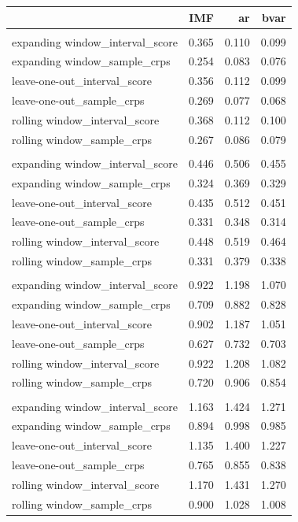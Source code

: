 \documentclass[
]{article}
\begin{document}
\begin{longtable}{l|rrr}
\toprule
\multicolumn{1}{l}{} & IMF & ar & bvar \\ 
\midrule\addlinespace[2.5pt]
\multicolumn{4}{l}{horizon = 0} \\ 
\midrule\addlinespace[2.5pt]
expanding window\_interval\_score & 0.365 & 0.110 & 0.099 \\ 
expanding window\_sample\_crps & 0.254 & 0.083 & 0.076 \\ 
leave-one-out\_interval\_score & 0.356 & 0.112 & 0.099 \\ 
leave-one-out\_sample\_crps & 0.269 & 0.077 & 0.068 \\ 
rolling window\_interval\_score & 0.368 & 0.112 & 0.100 \\ 
rolling window\_sample\_crps & 0.267 & 0.086 & 0.079 \\ 
\midrule\addlinespace[2.5pt]
\multicolumn{4}{l}{horizon = 0.5} \\ 
\midrule\addlinespace[2.5pt]
expanding window\_interval\_score & 0.446 & 0.506 & 0.455 \\ 
expanding window\_sample\_crps & 0.324 & 0.369 & 0.329 \\ 
leave-one-out\_interval\_score & 0.435 & 0.512 & 0.451 \\ 
leave-one-out\_sample\_crps & 0.331 & 0.348 & 0.314 \\ 
rolling window\_interval\_score & 0.448 & 0.519 & 0.464 \\ 
rolling window\_sample\_crps & 0.331 & 0.379 & 0.338 \\ 
\midrule\addlinespace[2.5pt]
\multicolumn{4}{l}{horizon = 1} \\ 
\midrule\addlinespace[2.5pt]
expanding window\_interval\_score & 0.922 & 1.198 & 1.070 \\ 
expanding window\_sample\_crps & 0.709 & 0.882 & 0.828 \\ 
leave-one-out\_interval\_score & 0.902 & 1.187 & 1.051 \\ 
leave-one-out\_sample\_crps & 0.627 & 0.732 & 0.703 \\ 
rolling window\_interval\_score & 0.922 & 1.208 & 1.082 \\ 
rolling window\_sample\_crps & 0.720 & 0.906 & 0.854 \\ 
\midrule\addlinespace[2.5pt]
\multicolumn{4}{l}{horizon = 1.5} \\ 
\midrule\addlinespace[2.5pt]
expanding window\_interval\_score & 1.163 & 1.424 & 1.271 \\ 
expanding window\_sample\_crps & 0.894 & 0.998 & 0.985 \\ 
leave-one-out\_interval\_score & 1.135 & 1.400 & 1.227 \\ 
leave-one-out\_sample\_crps & 0.765 & 0.855 & 0.838 \\ 
rolling window\_interval\_score & 1.170 & 1.431 & 1.270 \\ 
rolling window\_sample\_crps & 0.900 & 1.028 & 1.008 \\ 
\bottomrule
\end{longtable}
\end{document}
